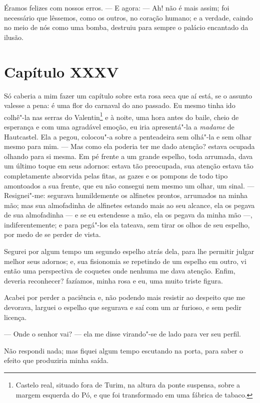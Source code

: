  Éramos felizes com nossos erros. --- E agora: --- Ah! não é mais assim;
foi necessário que lêssemos, como os outros, no coração humano; e a
verdade, caindo no meio de nós como uma bomba, destruiu para sempre o
palácio encantado da ilusão.

\section*{Capítulo XXXV}

 Só caberia a mim fazer um capítulo sobre esta rosa seca que aí está, se
o assunto valesse a pena: é uma flor do carnaval do ano passado. Eu
mesmo tinha ido colhê"-la nas serras do Valentin\footnote{ Castelo real,
situado fora de Turim, na altura da ponte suspensa, sobre a margem
esquerda do Pó, e que foi transformado em uma fábrica de tabaco.}
e à noite, uma hora antes do baile, cheio de esperança e com uma
agradável emoção, eu iria apresentá"-la a \textit{madame} de Hautcastel.
Ela a pegou, colocou"-a sobre a penteadeira sem olhá"-la e sem olhar
mesmo para mim. --- Mas como ela poderia ter me dado atenção? estava
ocupada olhando para si mesma. Em pé frente a um grande espelho, toda
arrumada, dava um último toque em seus adornos: estava tão preocupada,
sua atenção estava tão completamente absorvida pelas fitas, as gazes e
os pompons de todo tipo amontoados a sua frente, que eu não consegui
nem mesmo um olhar, um sinal. --- Resignei"-me: segurava humildemente os
alfinetes prontos, arrumados na minha mão; mas sua almofadinha de
alfinetes estando mais ao seu alcance, ela os pegava de sua
almofadinha --- e se eu estendesse a mão, ela os pegava da minha mão
---, indiferentemente; e para pegá"-los ela tateava, sem tirar os olhos
de seu espelho, por medo de se perder de vista.

 Segurei por algum tempo um segundo espelho atrás dela, para lhe
permitir julgar melhor seus adornos; e, sua fisionomia se repetindo de
um espelho em outro, vi então uma perspectiva de coquetes onde nenhuma
me dava atenção. Enfim, deveria reconhecer? fazíamos, minha rosa e eu,
uma muito triste figura.

 Acabei por perder a paciência e, não podendo mais resistir ao despeito
que me devorava, larguei o espelho que segurava e saí com um ar
furioso, e sem pedir licença.

 --- Onde o senhor vai? --- ela me disse virando"-se de lado para ver seu
perfil. 

Não respondi nada; mas fiquei algum tempo escutando na porta, para saber
o efeito que produziria minha saída.

